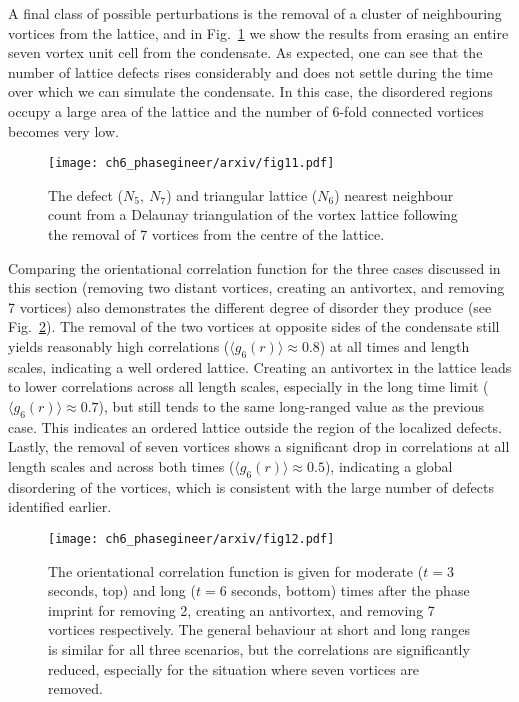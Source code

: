 A final class of possible perturbations is the removal of a cluster of neighbouring vortices from the lattice, and in Fig.~\ref{fig:remove7_defect} we show the results from erasing an entire seven vortex unit cell from the condensate. As expected, one can see that the number of lattice defects rises considerably and does not settle during the time over which we can simulate the condensate. In this case, the disordered regions occupy a large area of the lattice and the number of 6-fold connected vortices becomes very low.

\begin{figure}\centering
    \texttt{[image: ch6\_phasegineer/arxiv/fig11.pdf]}
    \caption{The defect ($N_5,~N_7$) and triangular lattice ($N_6$) nearest neighbour count from a Delaunay triangulation of the vortex lattice following the removal of 7 vortices from the centre of the lattice. }\label{fig:remove7_defect}
\end{figure}

Comparing the orientational correlation function for the three cases discussed in this section (removing two distant vortices, creating an antivortex, and removing 7 vortices) also demonstrates the different degree of disorder they produce (see Fig.~\ref{fig:g6_2edge_anti_nuclear}). The removal of the two vortices at opposite sides of the condensate still yields reasonably high correlations ($\langle g_6(r) \rangle \approx 0.8$) at all times and length scales, indicating a well ordered lattice. Creating an antivortex in the lattice leads to lower correlations across all length scales, especially in the long time limit ($\langle g_6(r) \rangle\approx 0.7$), but still tends to the same long-ranged value as the previous case. This indicates an ordered lattice outside the region of the localized defects. Lastly, the removal of seven vortices shows a significant drop in correlations at all length scales and across both times ($\langle g_6(r) \rangle\approx 0.5$), indicating a global disordering of the vortices, which is consistent with the large number of defects identified earlier.

\begin{figure}\centering
    \texttt{[image: ch6\_phasegineer/arxiv/fig12.pdf]}
    \caption{The orientational correlation function is given for moderate ($t=3$ seconds, top) and long ($t=6$ seconds, bottom) times after the phase imprint for removing 2, creating an antivortex, and removing 7 vortices respectively. The general behaviour at short and long ranges is similar for all three scenarios, but the correlations are significantly reduced, especially for the situation where seven vortices are removed.}\label{fig:g6_2edge_anti_nuclear}
\end{figure}

